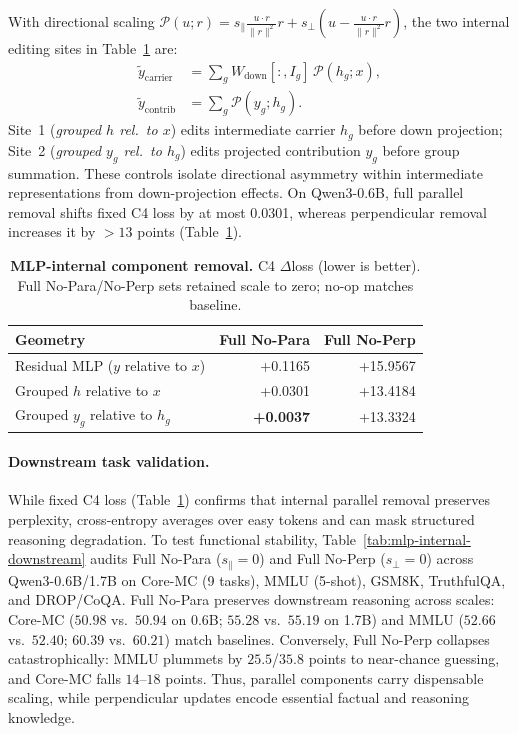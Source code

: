 With directional scaling $\mathcal{P}(u; r) = s_\parallel \frac{u \cdot r}{\|r\|^2}r + s_\perp \left(u - \frac{u \cdot r}{\|r\|^2}r\right)$,
the two internal editing sites in Table~\ref{tab:mlp-internal-carrier} are:
\begin{align}
  \widetilde{y}_{\mathrm{carrier}} &= \sum\nolimits_g W_{\mathrm{down}}[:,I_g]\,\mathcal{P}(h_g; x), \label{eq:mlp-site1} \\
  \widetilde{y}_{\mathrm{contrib}} &= \sum\nolimits_g \mathcal{P}(y_g; h_g). \label{eq:mlp-site2}
\end{align}
Site~1 (\emph{grouped $h$ rel.\ to $x$}) edits intermediate carrier $h_g$ before down projection;
Site~2 (\emph{grouped $y_g$ rel.\ to $h_g$}) edits projected contribution $y_g$ before group summation.
These controls isolate directional asymmetry within intermediate representations from down-projection effects.
On Qwen3-0.6B, full parallel removal shifts fixed C4 loss by at most 0.0301, whereas perpendicular removal increases
it by $>13$ points (Table~\ref{tab:mlp-internal-carrier}).

\begin{table}[H]
  \vspace{-4pt}
  \centering
  \scriptsize
  \caption{\textbf{MLP-internal component removal.}
  C4 $\Delta$loss (lower is better). Full No-Para/No-Perp sets retained scale to zero; no-op matches baseline.}
  \label{tab:mlp-internal-carrier}
  \setlength{\tabcolsep}{5pt}
  \begin{tabular}{lrr}
    \toprule
    Geometry & Full No-Para & Full No-Perp \\
    \midrule
    Residual MLP ($y$ relative to $x$) & +0.1165 & +15.9567 \\
    Grouped $h$ relative to $x$ & +0.0301 & +13.4184 \\
    Grouped $y_g$ relative to $h_g$ & \textbf{+0.0037} & +13.3324 \\
    \bottomrule
  \end{tabular}
  \vspace{-4pt}
\end{table}

\paragraph{Downstream task validation.}
While fixed C4 loss (Table~\ref{tab:mlp-internal-carrier}) confirms that internal parallel removal preserves perplexity, cross-entropy averages over easy tokens and can mask structured reasoning degradation.
To test functional stability, Table~\ref{tab:mlp-internal-downstream} audits Full No-Para ($s_{\parallel}=0$) and Full No-Perp ($s_{\perp}=0$) across Qwen3-0.6B/1.7B on Core-MC (9 tasks), MMLU (5-shot), GSM8K, TruthfulQA, and DROP/CoQA.
Full No-Para preserves downstream reasoning across scales: Core-MC ($50.98$ vs.\ $50.94$ on 0.6B; $55.28$ vs.\ $55.19$ on 1.7B) and MMLU ($52.66$ vs.\ $52.40$; $60.39$ vs.\ $60.21$) match baselines.
Conversely, Full No-Perp collapses catastrophically: MMLU plummets by $25.5$/$35.8$ points to near-chance guessing, and Core-MC falls $14$--$18$ points.
Thus, parallel components carry dispensable scaling, while perpendicular updates encode essential factual and reasoning knowledge.


